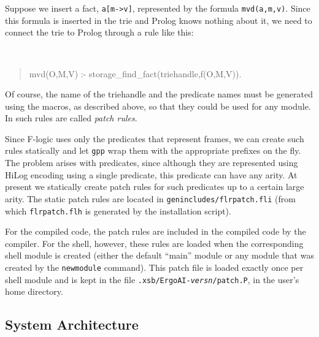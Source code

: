 \documentclass[11pt]{article}
\newcommand{\ERGO}{\mbox{\smaller{\ensuremath{\cal{E}}\smaller{{\sc{RGO}}}}}\xspace}
\newcommand{\FLSYSTEM}{\ERGO}
\newcommand{\fl}{\mbox{F-logic}\xspace}
\begin{document}
Suppose we insert a fact, {\tt a[m->v]}, represented by the formula
{\tt mvd(a,m,v)}. Since this formula is inserted in the trie and Prolog knows
nothing about it, we need to connect the trie to Prolog through a rule like
this:
{\tt
\begin{quote}
  mvd(O,M,V) :- storage\_find\_fact(triehandle,f(O,M,V)).
\end{quote}
}
Of course, the name of the triehandle and the predicate names must be
generated using the macros, as described above, so that they could be used
for any module. In \FLSYSTEM such rules are called \emph{patch rules}. 

Since \fl uses only the predicates that represent frames, we can
create such rules statically and let {\tt gpp} wrap them with the
appropriate prefixes on the fly.  The problem arises with predicates, since
although they are represented using HiLog encoding using a single
predicate, this predicate can have any arity.  At present we statically
create patch rules for such predicates up to a certain large arity.  The
static patch rules are located in {\tt genincludes/flrpatch.fli} (from
which {\tt flrpatch.flh} is generated by the \FLSYSTEM installation script).

For the compiled code, the patch rules are included in the compiled code
by the \FLSYSTEM compiler. For the \FLSYSTEM shell, however, these rules are
loaded when the corresponding shell module is created (either the default
``main'' module or any module that was created by the {\tt newmodule}
command). This patch file is loaded exactly once per shell module and is
kept in the file {\tt .xsb/ErgoAI-\emph{versn}/patch.P}, in the user's home directory.


\subsection{System Architecture}
\end{document}
